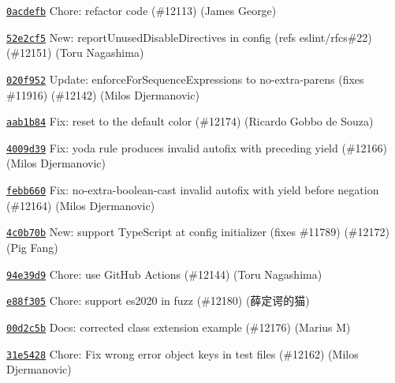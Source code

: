 \begin{DoxyItemize}
\item \href{https://github.com/eslint/eslint/commit/0acdefb97f35bb09db2910540c70dc377a01ad62}{\texttt{ {\ttfamily 0acdefb}}} Chore\+: refactor code (\#12113) (James George)
\item \href{https://github.com/eslint/eslint/commit/52e2cf50b35d57fb8466e0bcd0581eff1590fb4c}{\texttt{ {\ttfamily 52e2cf5}}} New\+: report\+Unused\+Disable\+Directives in config (refs eslint/rfcs\#22) (\#12151) (Toru Nagashima)
\item \href{https://github.com/eslint/eslint/commit/020f9526b618a191566acea3e17e20815d484c58}{\texttt{ {\ttfamily 020f952}}} Update\+: enforce\+For\+Sequence\+Expressions to no-\/extra-\/parens (fixes \#11916) (\#12142) (Milos Djermanovic)
\item \href{https://github.com/eslint/eslint/commit/aab1b840f9cffb2a76a5c9fe1852961be71dc184}{\texttt{ {\ttfamily aab1b84}}} Fix\+: reset to the default color (\#12174) (Ricardo Gobbo de Souza)
\item \href{https://github.com/eslint/eslint/commit/4009d39aa59451510aa24911e758d664f216289a}{\texttt{ {\ttfamily 4009d39}}} Fix\+: yoda rule produces invalid autofix with preceding yield (\#12166) (Milos Djermanovic)
\item \href{https://github.com/eslint/eslint/commit/febb6605d350c936d64cb73e694482cfbb20b29c}{\texttt{ {\ttfamily febb660}}} Fix\+: no-\/extra-\/boolean-\/cast invalid autofix with yield before negation (\#12164) (Milos Djermanovic)
\item \href{https://github.com/eslint/eslint/commit/4c0b70b869c16647f7af6de9d5c5479fc19f49db}{\texttt{ {\ttfamily 4c0b70b}}} New\+: support Type\+Script at config initializer (fixes \#11789) (\#12172) (Pig Fang)
\item \href{https://github.com/eslint/eslint/commit/94e39d9f782f45db86a079e07508d63040118ef1}{\texttt{ {\ttfamily 94e39d9}}} Chore\+: use Git\+Hub Actions (\#12144) (Toru Nagashima)
\item \href{https://github.com/eslint/eslint/commit/e88f305df9d454868624c559fd93b981a680c215}{\texttt{ {\ttfamily e88f305}}} Chore\+: support es2020 in fuzz (\#12180) (薛定谔的猫)
\item \href{https://github.com/eslint/eslint/commit/00d2c5be9a89efd90135c4368a9589f33df3f7ba}{\texttt{ {\ttfamily 00d2c5b}}} Docs\+: corrected class extension example (\#12176) (Marius M)
\item \href{https://github.com/eslint/eslint/commit/31e542819967b2aa1191e1abaa1c4a49fddbe3cf}{\texttt{ {\ttfamily 31e5428}}} Chore\+: Fix wrong error object keys in test files (\#12162) (Milos Djermanovic)

\end{DoxyItemize}
